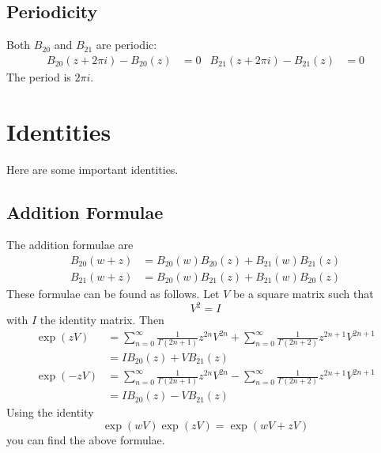 \subsection{Periodicity}
Both $B_{20}$ and $B_{21}$ are periodic:
\begin{align}
    B_{20}(z + 2\pi i) - B_{20}(z) &= 0 & B_{21}(z + 2\pi i) - B_{21}(z) &= 0
\end{align}
The period is $2\pi i$.
\section{Identities}
Here are some important identities.
\subsection{Addition Formulae}
The addition formulae are
\begin{align}
    B_{20}(w + z) &= B_{20}(w) B_{20}(z) + B_{21}(w) B_{21}(z) \\
    B_{21}(w + z) &= B_{20}(w) B_{21}(z) + B_{21}(w) B_{20}(z)
\end{align}
These formulae can be found as follows. Let $V$ be a square matrix such that
\begin{equation}
    V^{2} = I
\end{equation}
with $I$ the identity matrix. Then
\begin{align}
    \exp\left( z V \right) &= \sum_{n = 0}^{\infty} \frac{1}{\Gamma(2n + 1)} z^{2n} V^{2n} + \sum_{n = 0}^{\infty} \frac{1}{\Gamma(2n + 2)} z^{2n+1} V^{2n+1} \\ &= I B_{20}(z) + V B_{21}(z) \\
    \exp\left( -z V \right) &= \sum_{n = 0}^{\infty} \frac{1}{\Gamma(2n + 1)} z^{2n} V^{2n} - \sum_{n = 0}^{\infty} \frac{1}{\Gamma(2n + 2)} z^{2n+1} V^{2n+1} \\ &= I B_{20}(z) - V B_{21}(z)
\end{align}
Using the identity
\begin{equation}
    \exp\left( w V \right) \exp\left( z V \right) = \exp\left( wV + zV \right)
\end{equation}
you can find the above formulae.

